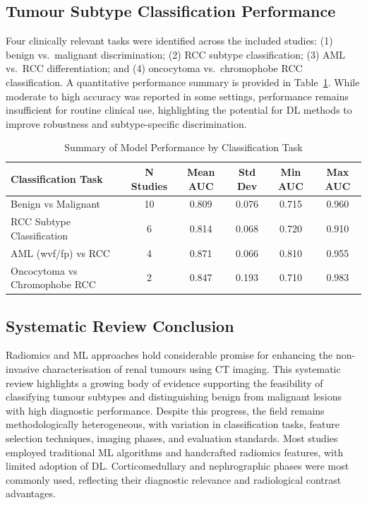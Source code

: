 \subsection{Tumour Subtype Classification Performance}

Four clinically relevant tasks were identified across the included studies: (1) benign vs.\ malignant discrimination; (2) RCC subtype classification; (3) AML vs.\ RCC differentiation; and (4) oncocytoma vs.\ chromophobe RCC classification. A quantitative performance summary is provided in Table~\ref{tab:task_performance_final}. While moderate to high accuracy was reported in some settings, performance remains insufficient for routine clinical use, highlighting the potential for DL methods to improve robustness and subtype-specific discrimination.


\begin{table}[ht]
\centering
\caption{Summary of Model Performance by Classification Task}
\small
\begin{tabular}{lccccc}
\hline
\textsf{Classification Task} & \textsf{N Studies} & \textsf{Mean AUC} & \textsf{Std Dev} & \textsf{Min AUC} & \textsf{Max AUC} \\
\hline
Benign vs Malignant             & 10 & 0.809 & 0.076 & 0.715 & 0.960 \\
RCC Subtype Classification      & 6  & 0.814 & 0.068 & 0.720 & 0.910 \\
AML (wvf/fp) vs RCC             & 4  & 0.871 & 0.066 & 0.810 & 0.955 \\
Oncocytoma vs Chromophobe RCC  & 2  & 0.847 & 0.193 & 0.710 & 0.983 \\
\hline
\end{tabular}
\label{tab:task_performance_final}
\end{table}
\subsection{Systematic Review Conclusion}
Radiomics and ML approaches hold considerable promise for enhancing the non-invasive characterisation of renal tumours using CT imaging. This systematic review highlights a growing body of evidence supporting the feasibility of classifying tumour subtypes and distinguishing benign from malignant lesions with high diagnostic performance. Despite this progress, the field remains methodologically heterogeneous, with variation in classification tasks, feature selection techniques, imaging phases, and evaluation standards. Most studies employed traditional ML algorithms and handcrafted radiomics features, with limited adoption of DL. Corticomedullary and nephrographic phases were most commonly used, reflecting their diagnostic relevance and radiological contrast advantages.

